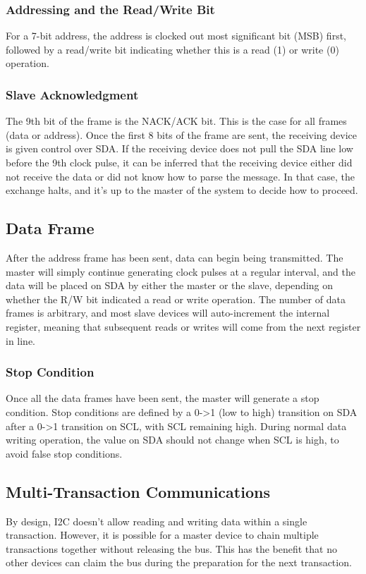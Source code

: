 \documentclass[11pt,fleqn]{book} %
\begin{document}
\subsubsection{Addressing and the Read/Write Bit}
For a 7-bit address, the address is clocked out most significant bit (MSB) first, followed by a read/write bit indicating whether this is a read (1) or write (0) operation. 
\subsubsection{Slave Acknowledgment}
The 9th bit of the frame is the NACK/ACK bit. This is the case for all frames (data or address). Once the first 8 bits of the frame are sent, the receiving device is given control over SDA. If the receiving device does not pull the SDA line low before the 9th clock pulse, it can be inferred that the receiving device either did not receive the data or did not know how to parse the message. In that case, the exchange halts, and it’s up to the master of the system to decide how to proceed.

\subsection{Data Frame}
After the address frame has been sent, data can begin being transmitted. The master will simply continue generating clock pulses at a regular interval, and the data will be placed on SDA by either the master or the slave, depending on whether the R/W bit indicated a read or write operation. The number of data frames is arbitrary, and most slave devices will auto-increment the internal register, meaning that subsequent reads or writes will come from the next register in line.
\subsubsection{Stop Condition}
Once all the data frames have been sent, the master will generate a stop condition. Stop conditions are defined by a 0->1 (low to high) transition on SDA after a 0->1 transition on SCL, with SCL remaining high. During normal data writing operation, the value on SDA should not change when SCL is high, to avoid false stop conditions.

\subsection{Multi-Transaction Communications}
 By design, I2C doesn't allow reading and writing data within a single transaction. However, it is possible for a master device to chain multiple transactions together without releasing the bus. This has the benefit that no other devices can claim the bus during the preparation for the next transaction. 
\end{document}
